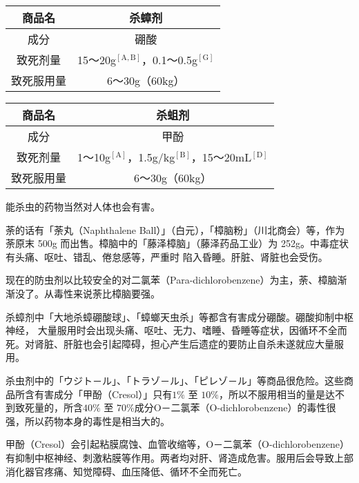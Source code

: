 \documentclass[UTF8]{ctexart}
\begin{document}
\begin{table}[htbp]
\begin{center}
\begin{tabular}{cc}

\toprule
商品名 & 杀蟑剂 \\
\midrule
成分 & 硼酸 \\
致死剂量 & 15～20g$^\mathrm{[A,B]}$，0.1～0.5g$^\mathrm{[G]}$ \\
致死服用量 & 6～30g（60kg）  \\
\bottomrule
\end{tabular}
\end{center}
\end{table}


\begin{table}[htbp]
\begin{center}
\begin{tabular}{cc}

\toprule
商品名 & 杀蛆剂 \\
\midrule
成分 & 甲酚 \\
致死剂量 & 1～10g$^\mathrm{[A]}$，1.5g/kg$^\mathrm{[B]}$，15～20mL$^\mathrm{[D]}$ \\
致死服用量 & 6～30g（60kg）  \\
\bottomrule
\end{tabular}
\end{center}
\end{table}

能杀虫的药物当然对人体也会有害。

荼的话有「荼丸（Naphthalene Ball）」（白元），「樟脑粉」（川北商会）等，作为荼原末 500g 而出售。樟脑中的「藤泽樟脑」（藤泽药品工业）为 252g。中毒症状有头痛、呕吐、错乱、倦怠感等，严重时 陷入昏睡。肝脏、肾脏也会受伤。

现在的防虫剂以比较安全的对二氯苯（Para-dichlorobenzene）为主，荼、樟脑渐渐没了。从毒性来说荼比樟脑要强。

杀蟑剂中「大地杀蟑硼酸球」、「蟑螂天虫杀」等都含有害成分硼酸。硼酸抑制中枢神经，
大量服用时会出现头痛、呕吐、无力、嗜睡、昏睡等症状，因循环不全而死。对肾脏、肝脏也会引起障碍，担心产生后遗症的要防止自杀未遂就应大量服用。

杀虫剂中的「ウジト－ル」、「トラゾ－ル」、「ピレゾ－ル」等商品很危险。这些商品所含有害成分「甲酚（Cresol）」只有$1\%$ 至 $10\%$，所以不服用相当的量是达不到致死量的，所含$40\%$ 至 $70\%$成分O－二氯苯（O-dichlorobenzene）的毒性很强，所以药物本身的毒性是相当大的。

甲酚（Cresol）会引起粘膜腐蚀、血管收缩等，O－二氯苯（O-dichlorobenzene）有抑制中枢神经、刺激粘膜等作用。两者均对肝、肾造成危害。服用后会导致上部消化器官疼痛、知觉障碍、血压降低、循环不全而死亡。
\end{document}
